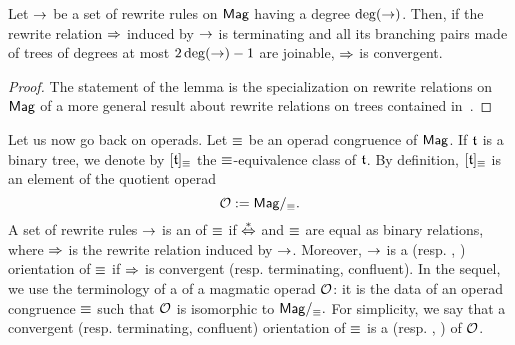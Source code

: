 \begin{Lemma} \label{lem:degree_confluence}
    Let $\operatorname{\to}$ be a set of rewrite rules on $\mathsf{Mag}$ having a degree
    $\mathrm{deg}(\operatorname{\to})$. Then, if the rewrite relation $\operatorname{\Rightarrow}$ induced by
    $\operatorname{\to}$ is terminating and all its branching pairs made of trees of
    degrees at most $2 \, \mathrm{deg}(\operatorname{\to}) - 1$ are joinable, $\operatorname{\Rightarrow}$ is
    convergent.
\end{Lemma}
\begin{proof}
    The statement of the lemma is the specialization on rewrite
    relations on $\mathsf{Mag}$ of a more general result about rewrite relations
    on trees contained in~\cite{Gir16}.
\end{proof}
\medbreak

Let us now go back on operads. Let $\operatorname{\equiv}$ be an operad congruence of
$\mathsf{Mag}$. If $\mathfrak{t}$ is a binary tree, we denote by $[\mathfrak{t}]_{\operatorname{\equiv}}$ the
$\operatorname{\equiv}$-equivalence class of $\mathfrak{t}$. By definition, $[\mathfrak{t}]_{\operatorname{\equiv}}$
is an element of the quotient operad
\begin{equation} \label{equ:quotient_operad_mag}
    \mathcal{O} := \mathsf{Mag}/_{\operatorname{\equiv}}.
\end{equation}
A set of rewrite rules $\operatorname{\to}$ is an  of $\operatorname{\equiv}$ if
$\operatorname{\overset{\ast}{\Leftrightarrow}}$ and $\operatorname{\equiv}$ are equal as binary relations, where
$\operatorname{\Rightarrow}$ is the rewrite relation induced by $\operatorname{\to}$. Moreover,
$\operatorname{\to}$ is a  (resp. , )
orientation of $\operatorname{\equiv}$ if $\operatorname{\Rightarrow}$ is convergent (resp.
terminating, confluent). In the sequel, we use the terminology of a
 of a magmatic operad $\mathcal{O}$: it is the data of an
operad congruence $\operatorname{\equiv}$ such that $\mathcal{O}$ is isomorphic to 
\begin{math}
  \mathsf{Mag}/_{\operatorname{\equiv}}.
\end{math}
For simplicity, we say that a convergent (resp. terminating, confluent)
orientation of $\operatorname{\equiv}$ is a  (resp. ,
)  of $\mathcal{O}$.
\medbreak

